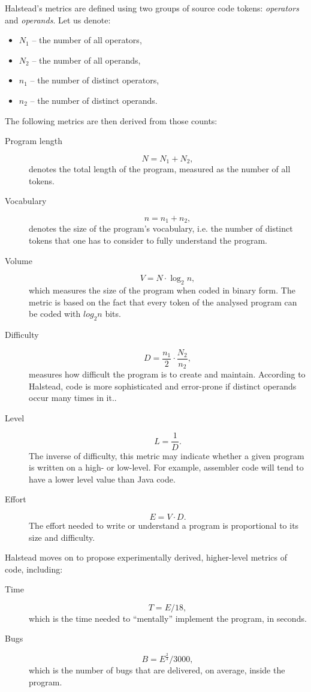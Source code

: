 \documentclass[11pt,a4paper,twoside]{article}
\begin{document}
\begin{multicols}{2}
Halstead's metrics are defined using two groups of source code tokens:
\emph{operators} and \emph{operands}. Let us denote:
\begin{itemize}
\item $N_1$ -- the number of all operators, 
\item $N_2$ -- the number of all operands, 
\item $n_1$ -- the number of distinct operators, 
\item $n_2$ -- the number of distinct operands.
\end{itemize}

The following metrics are then derived from those counts:
\begin{description}
\item[Program length]
  $$N = N_1 + N_2,$$ denotes the total length of the program, measured
  as the number of all tokens.
\item[Vocabulary]
  $$n = n_1 + n_2,$$ denotes the size of the program's vocabulary,
  i.e.  the number of distinct tokens that one has to consider to
  fully understand the program.
\item[Volume]
  $$V = N \cdot \log_2n,$$ which measures the size of the program when
  coded in binary form. The metric is based on the fact that every
  token of the analysed program can be coded with $log_2n$ bits.
\item[Difficulty]
  $$D = \frac{n_1}{2}\cdot\frac{N_2}{n_2},$$ measures how difficult
  the program is to create and maintain. According to Halstead, code
  is more sophisticated and error-prone if distinct operands occur
  many times in it..
\item[Level]
  $$L = \frac{1}{D}.$$ The inverse of difficulty, this metric may
  indicate whether a given program is written on a high- or
  low-level. For example, assembler code will tend to have a lower
  level value than Java code.
\item[Effort]
  $$E = V \cdot D.$$ The effort needed to write or understand a
  program is proportional to its size and difficulty.
\end{description}

Halstead moves on to propose experimentally derived, higher-level
metrics of code, including:
\begin{description}
\item[Time]
$$T = E/18,$$ which is the time needed to ``mentally'' implement the
  program, in seconds.
\item[Bugs]
$$B = E^{\frac{2}{3}}/3000,$$ which is the number of bugs that are
  delivered, on average, inside the program.
\end{description}


\end{multicols}
\end{document}
